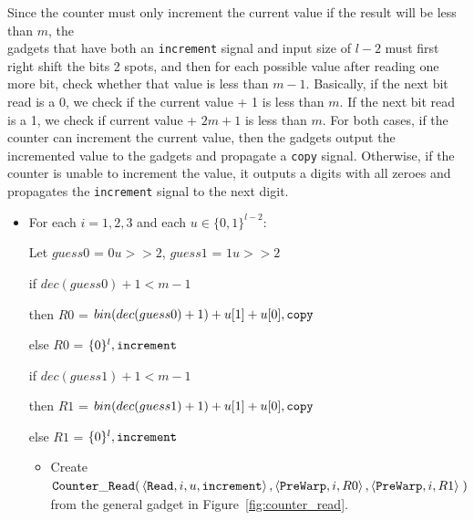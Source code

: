 Since the counter must only increment the current value if the result will be less than $m$,
the \\{\cread} gadgets that have both an {\tt increment} signal and input size of $l - 2$ must
first right shift the bits 2 spots, and then for each possible value after reading one more bit,
check whether that value is less than $m - 1$. Basically, if the next bit read is a 0, we check
if the current value + 1 is less than $m$. If the next bit read is a 1, we check if current value +
$2m + 1$ is less than $m$. For both cases, if the counter can increment the current value, then
the {\cread} gadgets output the incremented value to the {\prewarp} gadgets and propagate a {\tt copy}
signal. Otherwise, if the counter is unable to increment the value, it outputs a digits with all
zeroes and propagates the {\tt increment} signal to the next digit.

\begin{itemize}

    \item For each $i = 1,2,3$ and each $u \in \{0, 1\}^{l-2}$:

    Let $guess0$ = $0u >> 2$, $guess1$ = $1u >> 2$

    \vspace{.5cm}
    if $dec(guess0) + 1 < m - 1$

    then $R0$ = $bin(dec(guess0) + 1)+u[1]+u[0], {\tt copy}$

    else $R0$ = $\{0 \}^l, {\tt increment}$

    \vspace{.5cm}

    if $dec(guess1) + 1 < m - 1$

    then $R1$ = $bin(dec(guess1) + 1)+u[1]+u[0], {\tt copy}$

    else $R1$ = $\{0 \}^l, {\tt increment}$

    \vspace{.5cm}

    \begin{itemize}
        \item Create
        $\begin{aligned}[t]
            {\tt Counter\_Read}(& \left\langle {\tt Read},    i,  u, {\tt increment} \right\rangle,
                     \left\langle {\tt PreWarp}, i, R0                  \right\rangle,
                     \left\langle {\tt PreWarp}, i, R1                  \right\rangle \;)
        \end{aligned}$\\from the general gadget in Figure~\ref{fig:counter_read}.
    \end{itemize}

\end{itemize}


